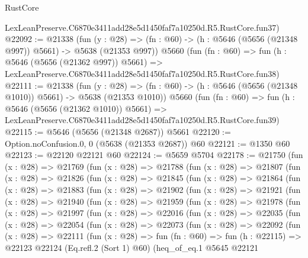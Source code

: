 \begin{lexlean}{RustCore}
\begin{coremodule}
    LexLeanPreserve.C6870e3411add28e5d1450faf7a10250d.R5.RustCore.fun37)
@22092 := @21338
    (fun (y : @28) => (fn : @60) -> (h : @5646 (@5656 (@21348 @997)) @5661) -> @5638 (@21353 @997))
    @5660
    (fun (fn : @60) =>
    fun (h : @5646 (@5656 (@21362 @997)) @5661) =>
    LexLeanPreserve.C6870e3411add28e5d1450faf7a10250d.R5.RustCore.fun38)
@22111 := @21338
    (fun (y : @28) =>
    (fn : @60) -> (h : @5646 (@5656 (@21348 @1010)) @5661) -> @5638 (@21353 @1010))
    @5660
    (fun (fn : @60) =>
    fun (h : @5646 (@5656 (@21362 @1010)) @5661) =>
    LexLeanPreserve.C6870e3411add28e5d1450faf7a10250d.R5.RustCore.fun39)
@22115 := @5646 (@5656 (@21348 @2687)) @5661
@22120 := Option.noConfusion.{0, 0} (@5638 (@21353 @2687)) @60
@22121 := @1350 @60
@22123 := @22120 @22121 @60
@22124 := @5659 @5704
@22178 := @21750
    (fun (x : @28) =>
    @21769
      (fun (x : @28) =>
      @21788
        (fun (x : @28) =>
        @21807
          (fun (x : @28) =>
          @21826
            (fun (x : @28) =>
            @21845
              (fun (x : @28) =>
              @21864
                (fun (x : @28) =>
                @21883
                  (fun (x : @28) =>
                  @21902
                    (fun (x : @28) =>
                    @21921
                      (fun (x : @28) =>
                      @21940
                        (fun (x : @28) =>
                        @21959
                          (fun (x : @28) =>
                          @21978
                            (fun (x : @28) =>
                            @21997
                              (fun (x : @28) =>
                              @22016
                                (fun (x : @28) =>
                                @22035
                                  (fun (x : @28) =>
                                  @22054
                                    (fun (x : @28) =>
                                    @22073
                                      (fun (x : @28) =>
                                      @22092
                                        (fun (x : @28) =>
                                        @22111
                                          (fun (x : @28) =>
                                          fun (fn : @60) =>
                                          fun (h : @22115) =>
                                          @22123
                                            @22124
                                            (Eq.refl.{2} (Sort 1) @60)
                                            (heq_of_eq.{1}
                                              @5645
                                              @22121

\end{coremodule}
\end{lexlean}
